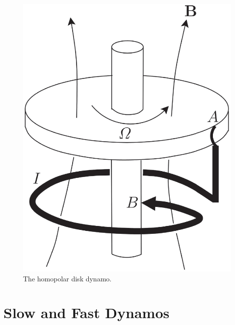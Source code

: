 \documentclass[12pt,a4paper]{article}
\begin{document}
\begin{figure}
\centering
\includegraphics[height=10.cm, angle=0]{homopolar_disk_dynamo.eps}
\caption{
The homopolar disk dynamo.
}
\label{fig:homopolar}
\end{figure}


\section{Slow and Fast Dynamos}
\cite{Plasma2014} 









\end{document}
